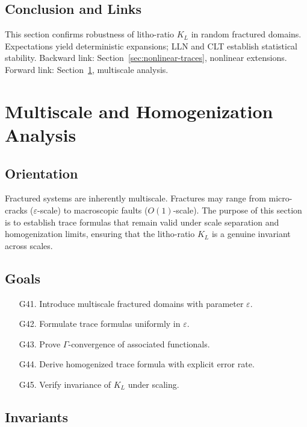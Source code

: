 \subsection*{Conclusion and Links}

This section confirms robustness of litho-ratio $K_L$ in random fractured domains.  
Expectations yield deterministic expansions; LLN and CLT establish statistical stability.  
Backward link: Section~\ref{sec:nonlinear-traces}, nonlinear extensions.  
Forward link: Section~\ref{sec:multiscale-traces}, multiscale analysis.  

\section{Multiscale and Homogenization Analysis}
\label{sec:multiscale-traces}

\subsection*{Orientation}

Fractured systems are inherently multiscale.  
Fractures may range from micro-cracks ($\varepsilon$-scale) to macroscopic faults ($O(1)$-scale).  
The purpose of this section is to establish trace formulas that remain valid under scale separation and homogenization limits, ensuring that the litho-ratio $K_L$ is a genuine invariant across scales.  

\subsection*{Goals}

\begin{itemize}
  \item[G41.] Introduce multiscale fractured domains with parameter $\varepsilon$. 
  \item[G42.] Formulate trace formulas uniformly in $\varepsilon$. 
  \item[G43.] Prove $\Gamma$-convergence of associated functionals. 
  \item[G44.] Derive homogenized trace formula with explicit error rate. 
  \item[G45.] Verify invariance of $K_L$ under scaling. 
\end{itemize}

\subsection*{Invariants}

